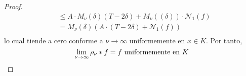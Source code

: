 \documentclass[12pt]{report}
\theoremstyle{largebreak}
\newcommand{\N}[2]{\ensuremath{\mathcal{N}_{#1}\left(#2\right)}}
\begin{document}
\begin{proof}
\begin{equation*}
\begin{split}
                &\leq A\cdot M_\nu(\delta)(T-2\delta)+M_\nu((\delta))\cdot\N{1}{f}\\
                &= M_\nu(\delta)\left(A\cdot (T-2\delta)+\N{1}{f} \right)\\
            \end{split}
        \end{equation*}
        lo cual tiende a cero conforme a $\nu\rightarrow\infty$ uniformemente en $x\in K$. Por tanto,
        \begin{equation*}
            \lim_{\nu\rightarrow\infty}\rho_\nu*f=f\textup{ uniformemente en }K
        \end{equation*}
    \end{proof}
\end{document}
